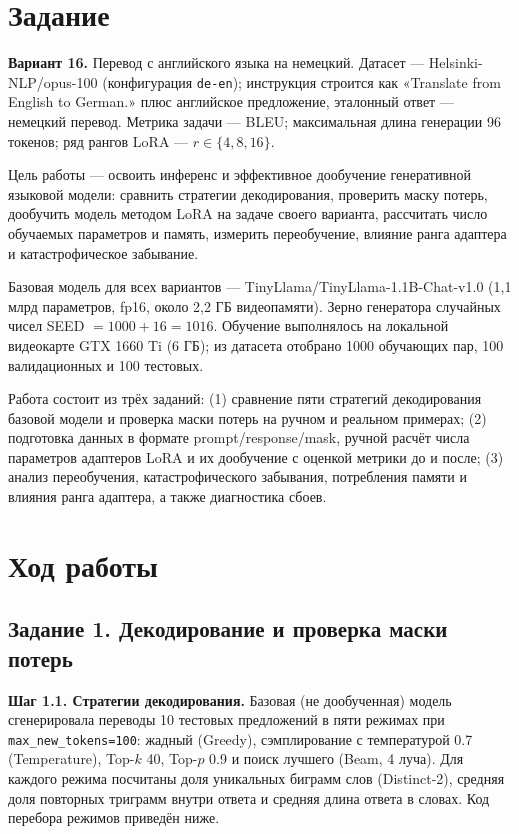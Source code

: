 \documentclass[14pt,a4paper]{extarticle}
\begin{document}
\section{Задание}

\textbf{Вариант 16.} Перевод с английского языка на немецкий. Датасет --- Helsinki-NLP/opus-100
(конфигурация \texttt{de-en}); инструкция строится как «Translate from English to German.»
плюс английское предложение, эталонный ответ --- немецкий перевод. Метрика задачи --- BLEU;
максимальная длина генерации 96 токенов; ряд рангов LoRA --- $r \in \{4, 8, 16\}$.

Цель работы --- освоить инференс и эффективное дообучение генеративной языковой модели:
сравнить стратегии декодирования, проверить маску потерь, дообучить модель методом LoRA
на задаче своего варианта, рассчитать число обучаемых параметров и память, измерить
переобучение, влияние ранга адаптера и катастрофическое забывание.

Базовая модель для всех вариантов --- TinyLlama/TinyLlama-1.1B-Chat-v1.0 (1,1 млрд
параметров, fp16, около 2,2 ГБ видеопамяти). Зерно генератора случайных чисел
SEED $= 1000 + 16 = 1016$. Обучение выполнялось на локальной видеокарте GTX 1660 Ti
(6 ГБ); из датасета отобрано 1000 обучающих пар, 100 валидационных и 100 тестовых.

Работа состоит из трёх заданий: (1) сравнение пяти стратегий декодирования базовой
модели и проверка маски потерь на ручном и реальном примерах; (2) подготовка данных
в формате prompt/response/mask, ручной расчёт числа параметров адаптеров LoRA и их
дообучение с оценкой метрики до и после; (3) анализ переобучения, катастрофического
забывания, потребления памяти и влияния ранга адаптера, а также диагностика сбоев.

\section{Ход работы}

\subsection{Задание 1. Декодирование и проверка маски потерь}

\textbf{Шаг 1.1. Стратегии декодирования.} Базовая (не дообученная) модель сгенерировала
переводы 10 тестовых предложений в пяти режимах при \texttt{max\_new\_tokens=100}:
жадный (Greedy), сэмплирование с температурой 0.7 (Temperature), Top-$k$ 40, Top-$p$ 0.9
и поиск лучшего (Beam, 4 луча). Для каждого режима посчитаны доля уникальных биграмм
слов (Distinct-2), средняя доля повторных триграмм внутри ответа и средняя длина ответа
в словах. Код перебора режимов приведён ниже.
\end{document}
